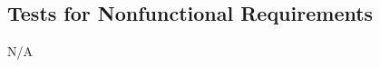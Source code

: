 \documentclass[12pt, titlepage]{article}
\begin{document}
					
					



    



\subsection{Tests for Nonfunctional Requirements}

N/A



		


					
					
					
					
					
\end{document}
